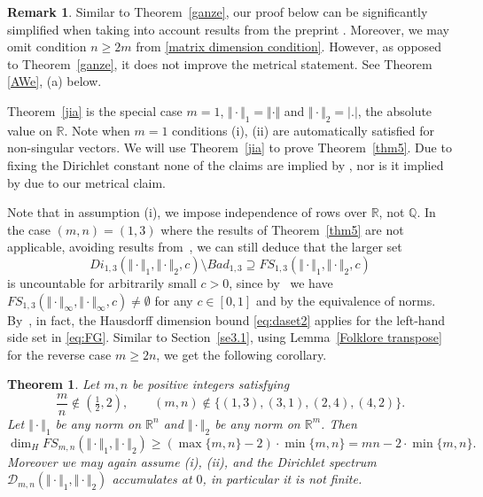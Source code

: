 \documentclass[10pt]{amsart}
\newtheorem{theorem}{Theorem}[section]
\theoremstyle{definition}
\newtheorem{remark}{Remark}
\newcommand{\R}{\mathbb{R}}
\newcommand{\Q}{\mathbb{Q}}
\begin{document}
\begin{remark} \label{REMA}
Similar to Theorem~\ref{ganze}, our proof below can be significantly simplified when taking into account 
results from the preprint \cite{AginWeiss2024}.
Moreover, we may omit 
condition $n\ge 2m$ from \eqref{matrix dimension condition}.
However, as opposed to Theorem~\ref{ganze},  it does not improve the metrical statement. See Theorem \ref{AWe}, (a) below.
\end{remark}


Theorem~\ref{jia} is the special case $m=1$, $\Vert\cdot\Vert_{1}=\Vert\cdot\Vert$ and $\Vert\cdot\Vert_2=|.|$, the absolute value on $\R$. Note when $m=1$ conditions (i), (ii) are automatically satisfied for non-singular vectors. We will use 
Theorem~\ref{jia} to prove Theorem~\ref{thm5}. Due to fixing the Dirichlet constant none of the claims are implied by \cite{Dasetal}, nor is it implied by \cite{AginWeiss2024} due to our metrical claim. \par 
Note that in assumption (i), we impose
independence of rows over $\R$, not $\Q$. In the case $(m,n)=(1,3)$ where the results of Theorem~\ref{thm5} 
are not applicable, avoiding results from~\cite{Dasetal}, we can still deduce that the larger set
\begin{equation} \label{eq:FG}
Di_{1,3}(\Vert\cdot\Vert_{1},\Vert\cdot\Vert_{2},c)\setminus Bad_{1,3}\supseteq FS_{1,3}(\Vert\cdot\Vert_{1},\Vert\cdot\Vert_{2},c)
\end{equation}
is uncountable for arbitrarily small $c>0$, since 
by~\cite{j2} we have 
$FS_{1,3}(\Vert\cdot\Vert_{\infty},\Vert\cdot\Vert_{\infty},c)\ne \emptyset$ for any
$c\in [0,1]$
and by the equivalence of norms.
By~\cite{Dasetal}, in fact, the Hausdorff dimension bound \eqref{eq:daset2} applies for the left-hand side set in \eqref{eq:FG}. Similar to 
Section~\ref{se3.1}, using Lemma~\ref{Folklore transpose} for the reverse case $m\ge 2n$,
we get the following corollary. 

\begin{theorem}  \label{tT}
	Let $m,n$ be positive integers satisfying 
 \begin{equation} \label{eq:jjj}
\frac{m}{n}\notin \left(\tfrac{1}{2} , 2\right) , \qquad  (m,n)\notin \{ (1,3), (3,1), (2,4) , (4,2) \}.
 \end{equation}
	Let $\Vert\cdot\Vert_1$ be any norm on $\R^n$ and $\Vert\cdot\Vert_2$ be any 
	norm on $\R^m$.
	Then 
	\[
	\dim_H FS_{m,n}(\Vert\cdot\Vert_1,\Vert\cdot\Vert_2) \geq (\max\{m,n\}-2)\cdot \min\{m,n\}=mn-2\cdot \min\{m,n\}.
	\]
 Moreover we may again assume (i), (ii), and the Dirichlet spectrum $\mathcal{D}_{m,n}(\Vert\cdot\Vert_1, \Vert\cdot\Vert_2)$ accumulates at $0$, in particular it is not finite.
\end{theorem}
\end{document}
